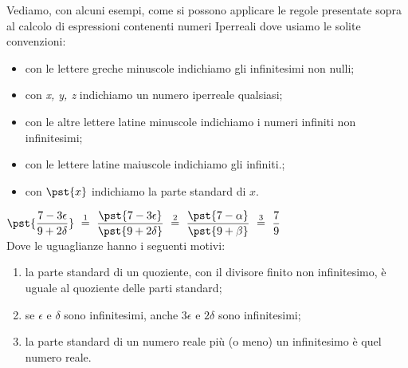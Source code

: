 Vediamo, con alcuni esempi, come si possono applicare le regole presentate 
sopra al calcolo di espressioni contenenti numeri Iperreali dove usiamo le 
solite convenzioni:
\begin{itemize} [noitemsep]
 \item con le lettere greche minuscole indichiamo gli infinitesimi non nulli;
 \item con \emph{x, y, z} indichiamo un numero iperreale qualsiasi;
 \item con le altre lettere latine minuscole indichiamo i numeri infiniti non 
infinitesimi;
 \item con le lettere latine maiuscole indichiamo gli infiniti.;
 \item con \(\pst{x}\) indichiamo la parte standard di \(x\).
\end{itemize}

\begin{esempio}

\(\pst{\dfrac{7 -3 \epsilon}{9 +2 \delta}} 
~ \stackrel{1}{=} ~
  \dfrac{\pst{7 -3 \epsilon}}{\pst{9 +2 \delta}} 
~ \stackrel{2}{=} ~
  \dfrac{\pst{7 -\alpha}}{\pst{9 +\beta}} 
~ \stackrel{3}{=} ~
  \dfrac{7}{9}\)\\

Dove le uguaglianze hanno i seguenti motivi:
\begin{enumerate} [nosep]
 \item la parte standard di un quoziente, con il divisore finito non 
infinitesimo, è uguale al quoziente delle parti standard; 
 \item se \(\epsilon \text{ e } \delta\) sono infinitesimi, 
 anche \(3\epsilon\) e \(2 \delta\) sono infinitesimi;
 \item la parte standard di un numero reale più (o meno) un infinitesimo è quel 
numero reale.
\end{enumerate}
\end{esempio}


